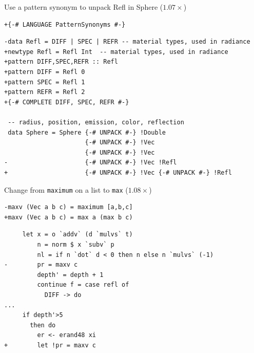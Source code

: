 \documentclass[8pt]{beamer}
\begin{document}
\begin{frame}[fragile]{Use a pattern synonym to unpack Refl in Sphere ($1.07\times$)}

\begin{verbatim}
+{-# LANGUAGE PatternSynonyms #-}
\end{verbatim}


\begin{verbatim}
-data Refl = DIFF | SPEC | REFR -- material types, used in radiance
+newtype Refl = Refl Int  -- material types, used in radiance
+pattern DIFF,SPEC,REFR :: Refl
+pattern DIFF = Refl 0
+pattern SPEC = Refl 1
+pattern REFR = Refl 2
+{-# COMPLETE DIFF, SPEC, REFR #-}

 -- radius, position, emission, color, reflection
 data Sphere = Sphere {-# UNPACK #-} !Double 
                      {-# UNPACK #-} !Vec
                      {-# UNPACK #-} !Vec 
-                     {-# UNPACK #-} !Vec !Refl
+                     {-# UNPACK #-} !Vec {-# UNPACK #-} !Refl

 \end{verbatim}

\end{frame}



\begin{frame}[fragile]{Change from \texttt{maximum} on a list to \texttt{max} ($1.08\times$)}
\begin{verbatim}
-maxv (Vec a b c) = maximum [a,b,c]
+maxv (Vec a b c) = max a (max b c)
\end{verbatim}

\begin{verbatim}
     let x = o `addv` (d `mulvs` t)
         n = norm $ x `subv` p
         nl = if n `dot` d < 0 then n else n `mulvs` (-1)
-        pr = maxv c
         depth' = depth + 1
         continue f = case refl of
           DIFF -> do
...
     if depth'>5
       then do
         er <- erand48 xi
+        let !pr = maxv c
\end{verbatim}
\end{frame}

\end{document}
